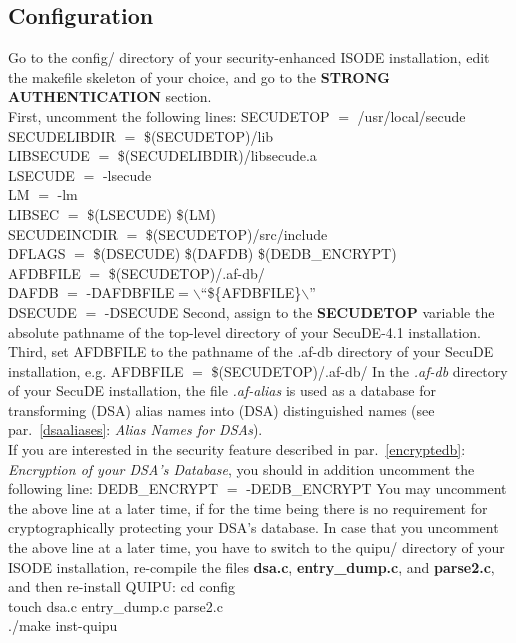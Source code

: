\subsection{Configuration}
Go to the config/ directory of your security-enhanced ISODE installation, edit the makefile 
skeleton of your choice, and go to the {\bf STRONG AUTHENTICATION} section.
\\ [1em]
First, uncomment the following lines:
\bvtab
\1 SECUDETOP  $=$  /usr/local/secude \\
\1 SECUDELIBDIR  $=$  \$(SECUDETOP)/lib \\
\1 LIBSECUDE  $=$  \$(SECUDELIBDIR)/libsecude.a \\
\1 LSECUDE  $=$  -lsecude \\
\1 LM  $=$  -lm \\
\1 LIBSEC  $=$  \$(LSECUDE) \$(LM) \\
\1 SECUDEINCDIR  $=$  \$(SECUDETOP)/src/include \\
\1 DFLAGS  $=$  \$(DSECUDE) \$(DAFDB) \$(DEDB\_ENCRYPT) \\
\1 AFDBFILE  $=$  \$(SECUDETOP)/.af-db/ \\
\1 DAFDB  $=$  -DAFDBFILE$=$$\backslash$``\$\{AFDBFILE\}$\backslash$'' \\
\1 DSECUDE  $=$  -DSECUDE 
\evtab
Second, assign to the {\bf SECUDETOP} variable the absolute pathname of the top-level directory 
of your SecuDE-4.1 installation.
\\ [1em]
Third, set AFDBFILE to the pathname of the .af-db directory of your SecuDE installation, e.g.
\bvtab
\1 AFDBFILE  $=$  \$(SECUDETOP)/.af-db/
\evtab
In the {\em .af-db} directory of your SecuDE installation, the file {\em .af-alias} is used as a 
database for transforming (DSA) alias names into (DSA) distinguished names 
(see par.~\ref{dsaaliases}: {\em Alias Names for DSAs}).
\\ [1em]
If you are interested in the security feature described in par.~\ref{encryptedb}:
{\em Encryption of your DSA's Database}, you should in addition uncomment the following line:
\bvtab
\1 DEDB\_ENCRYPT  $=$  -DEDB\_ENCRYPT
\evtab
You may uncomment the above line at a later time, if for the time being there is no requirement
for cryptographically protecting your DSA's database.
In case that you uncomment the above line at a later time, you have to switch to the quipu/ directory 
of your ISODE installation, re-compile the files
{\bf dsa.c}, {\bf entry\_dump.c}, and {\bf parse2.c}, and then re-install QUIPU:
\bvtab
\1 cd config \\
\1 touch dsa.c entry\_dump.c parse2.c \\
\1 ./make inst-quipu
\evtab



